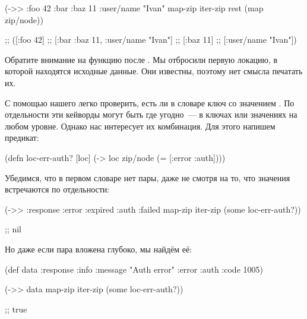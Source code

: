 \else

\begin{english}
  \begin{clojure}
(->> {:foo 42
      :bar {:baz 11
            :user/name "Ivan"}}
     map-zip
     iter-zip
     rest
     (map zip/node))

;; ([:foo 42]
;;  [:bar {:baz 11, :user/name "Ivan"}]
;;  [:baz 11]
;;  [:user/name "Ivan"])
  \end{clojure}
\end{english}

\fi

Обратите внимание на функцию  после  . Мы
отбросили первую локацию, в которой находятся исходные данные. Они известны,
поэтому нет смысла печатать их.

С помощью нашего  легко проверить, есть ли в словаре ключ
 со значением . По отдельности эти кейворды могут быть
где угодно~--- в ключах или значениях на любом уровне. Однако нас интересует их
комбинация. Для этого напишем предикат:

\begin{english}
  \begin{clojure}
(defn loc-err-auth? [loc]
  (-> loc zip/node (= [:error :auth])))
  \end{clojure}
\end{english}

Убедимся, что в первом словаре нет пары, даже не смотря на то, что значения
встречаются по отдельности:

\begin{english}
  \begin{clojure}
(->> {:response {:error :expired
                 :auth :failed}}
     map-zip
     iter-zip
     (some loc-err-auth?))

;; nil
  \end{clojure}
\end{english}

Но даже если пара вложена глубоко, мы найдём её:

\begin{english}
  \begin{clojure}
(def data
  {:response {:info {:message "Auth error"
                     :error :auth
                     :code 1005}}})

(->> data
     map-zip
     iter-zip
     (some loc-err-auth?))

;; true
  \end{clojure}
\end{english}

